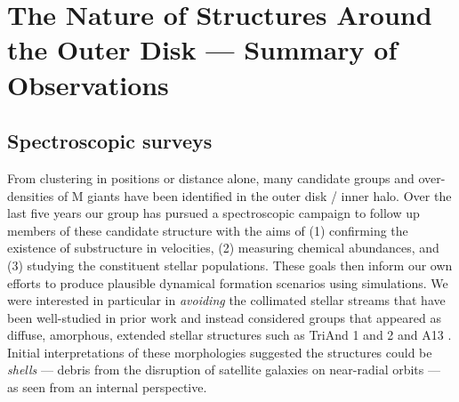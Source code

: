 \documentclass[galaxies,article,submit,moreauthors,pdftex,10pt,a4paper]{mdpi}
\begin{document}

\section{The Nature of Structures Around the Outer Disk --- Summary of Observations}
\label{sec:obs}

\subsection{Spectroscopic surveys}

From clustering in positions or distance alone, many candidate groups and
over-densities of M giants have been identified in the outer disk / inner halo.
Over the last five years our group has pursued a spectroscopic campaign to
follow up members of these candidate structure with the aims of (1) confirming
the existence of substructure in velocities, (2) measuring chemical abundances,
and (3) studying the constituent stellar populations.
These goals then inform our own efforts to produce plausible dynamical
formation scenarios using simulations.
We were interested in particular in {\it avoiding} the collimated stellar streams that have been well-studied in prior work \citep[such as Sgr, Orphan, GD1 and Pal 5 --- see, e.g.,][]{law10,koposov10,kuepper15,bovy16}
and instead considered groups that appeared as diffuse, amorphous, extended stellar structures such as TriAnd 1 and 2 \citep{rochapinto04} and A13 \citep{sharma10}.
Initial interpretations of these morphologies suggested the structures could be {\it shells} --- debris from the disruption of satellite galaxies on near-radial orbits \citep{johnston08} --- as seen from an internal perspective.
\end{document}
